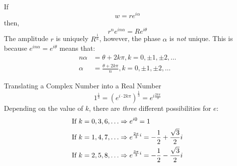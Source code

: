 \documentclass[12pt]{article}
\begin{document}
If
\begin{equation*}
  w = re^{i \alpha}
\end{equation*}
then,
\begin{equation*}
  r^ne^{in \alpha} = Re^{i \theta}
\end{equation*}
The amplitude $r$ is uniquely $R^{\frac{1}{n}}$, however, the phase $\alpha$ is \textit{not} unique. This is because $e^{in \alpha} = e^{i \theta}$ means that:
\begin{align*}
  n \alpha &= \theta + 2k\pi, k=0,\pm1,\pm2,\hdots \\
  \alpha   &= \frac{\theta + 2k\pi}{n}, k=0,\pm1,\pm2,\hdots
\end{align*}
\begin{example}{Translating a Complex Number into a Real Number}
  \begin{equation*}
    1^{\frac{1}{3}} = \left(e^{i \cdot 2k\pi}\right)^{\frac{1}{3}}  =e^{i \frac{2k\pi}{3}}
  \end{equation*}
  Depending on the value of $k$, there are \textit{three} different possibilities for $e$: \\
  \begin{align*}
    &\textup{If}\ k=0,3,6,\hdots \Rightarrow e^{i0}=1 \\
    &\textup{If}\ k=1,4,7,\hdots \Rightarrow e^{\frac{2\pi}{3}i}=-\frac{1}{2}+\frac{\sqrt{3}}{2}i \\
    &\textup{If}\ k=2,5,8,\hdots \Rightarrow e^{\frac{3\pi}{3}i}=-\frac{1}{2}-\frac{\sqrt{3}}{2}i \\
  \end{align*}
\end{example}
\end{document}
